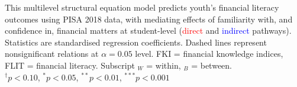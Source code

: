 {
}{This multilevel structural equation model predicts youth's financial literacy outcomes using PISA 2018 data, with mediating effects of familiarity with, and confidence in, financial matters at student-level (\textcolor{red}{direct} and \textcolor{blue}{indirect} pathways). Statistics are standardised regression coefficients. Dashed lines represent nonsignificant relations at $\alpha=0.05$ level. FKI = financial knowledge indices, FLIT = financial literacy. Subscript $_W$ = within, $_B$ = between.\\
$^{\dagger}p<0.10$, $^{*}p<0.05$, $^{**}p<0.01$, $^{***}p<0.001$}
